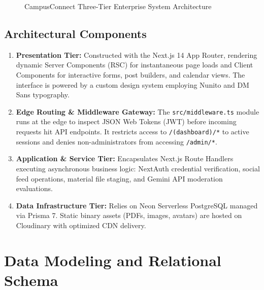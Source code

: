 \documentclass[11pt,a4paper]{report}
\begin{document}
\begin{figure}[htbp]
\caption{CampusConnect Three-Tier Enterprise System Architecture}
\label{fig:architecture}
\end{figure}

\subsection{Architectural Components}

\begin{enumerate}
    \item \textbf{Presentation Tier:} Constructed with the Next.js 14 App Router, rendering dynamic Server Components (RSC) for instantaneous page loads and Client Components for interactive forms, post builders, and calendar views. The interface is powered by a custom design system employing Nunito and DM Sans typography.
    \item \textbf{Edge Routing \& Middleware Gateway:} The \texttt{src/middleware.ts} module runs at the edge to inspect JSON Web Tokens (JWT) before incoming requests hit API endpoints. It restricts access to \texttt{/(dashboard)/*} to active sessions and denies non-administrators from accessing \texttt{/admin/*}.
    \item \textbf{Application \& Service Tier:} Encapsulates Next.js Route Handlers executing asynchronous business logic: NextAuth credential verification, social feed operations, material file staging, and Gemini API moderation evaluations.
    \item \textbf{Data Infrastructure Tier:} Relies on Neon Serverless PostgreSQL managed via Prisma 7. Static binary assets (PDFs, images, avatars) are hosted on Cloudinary with optimized CDN delivery.
\end{enumerate}

\section{Data Modeling and Relational Schema}
\end{document}
